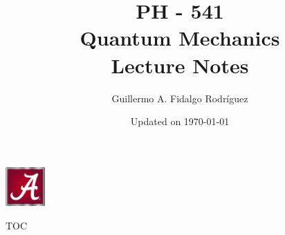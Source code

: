 \documentclass[aspectratio=43]{beamer}
\title[Lecture Notes]{PH - 541\\ Quantum Mechanics \\Lecture Notes}
\date[\today]{Updated on \today}
\author[G. Fidalgo]{Guillermo A. Fidalgo Rodríguez}
\institute[UA]{University of Alabama}
\begin{document}
\begin{frame}
	\titlepage
	\hfill
	\includegraphics[width=1.5cm]{Images/UA_logo.jpg}
\end{frame}

\begin{frame}{TOC}
	\tableofcontents
\end{frame}


% 
%
%
%
% 
\end{document}
